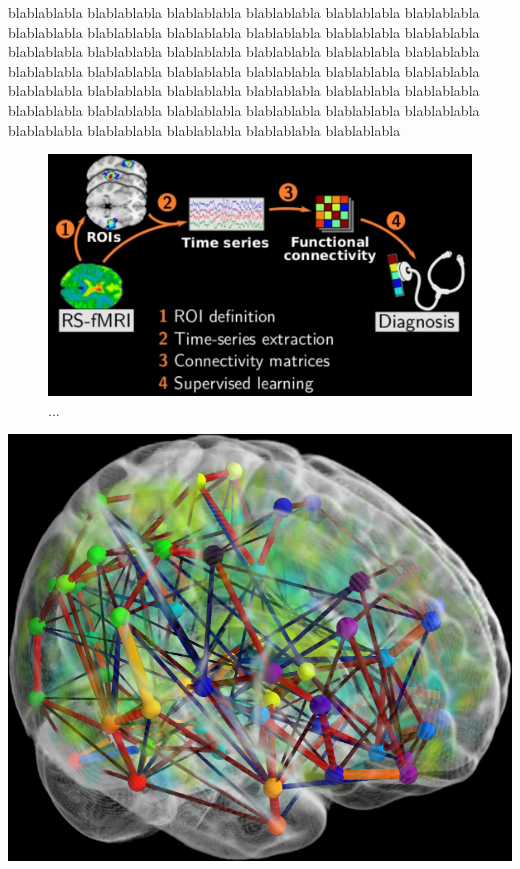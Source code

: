 blablablabla
blablablabla
blablablabla
blablablabla
blablablabla
blablablabla
blablablabla
blablablabla
blablablabla
blablablabla
blablablabla
blablablabla
blablablabla
blablablabla
blablablabla
blablablabla
blablablabla
blablablabla
blablablabla
blablablabla
blablablabla
blablablabla
blablablabla
blablablabla
blablablabla
blablablabla
blablablabla
blablablabla
blablablabla
blablablabla
blablablabla
blablablabla
blablablabla
blablablabla
blablablabla
blablablabla
blablablabla
blablablabla
blablablabla
blablablabla
blablablabla

\begin{figure}[!htbp]
  \includegraphics[width=1\linewidth]{figures/big_picture.png}
  \caption{...}
\end{figure}
\begin{marginfigure}%
  \includegraphics[width=1\linewidth]{figures/connectome.png}
  \caption{...}
\end{marginfigure}

